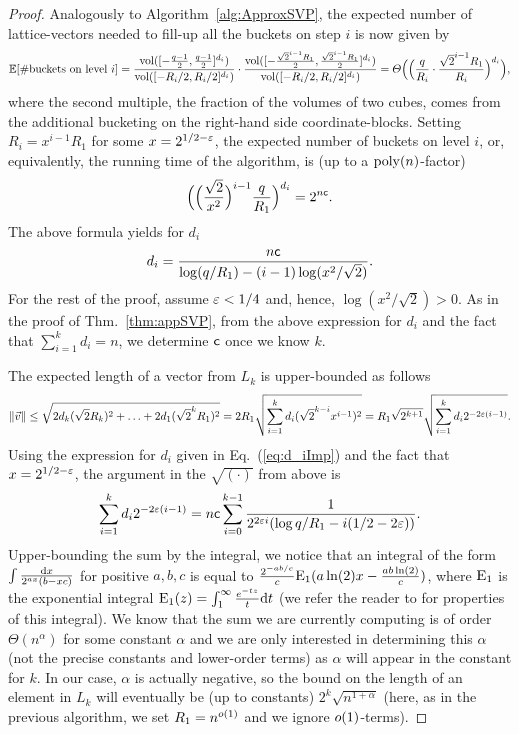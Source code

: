 \begin{proof}
	Analogously to Algorithm~\ref{alg:ApproxSVP}, the expected number of lattice-vectors needed to fill-up all the buckets on step $i$ is now given by
	\[
		\operatorname*{\mathbb{E}}[\#\text{buckets on level } i]= \frac{\operatorname{\mathrm{vol}}([-\frac{q-1}{2}, \frac{q-1}{2}]^{d_i})}{\operatorname{\mathrm{vol}}([-R_i/2, R_i/2]^{d_i})} \cdot \frac{\operatorname{\mathrm{vol}}([-\frac{\sqrt{2}^{i-1}R_1}{2}, \frac{\sqrt{2}^{i-1}R_1}{2}]^{d_i})}{\operatorname{\mathrm{vol}}([-R_i/2, R_i/2]^{d_i})} = \varTheta \Big( \Big(\frac{q}{R_i} \cdot \frac{\sqrt{2}^{i-1}R_1}{R_i} \Big)^{d_i}\Big),
	\]
	where the second multiple, the fraction of the volumes of two cubes, comes from the additional bucketing on the right-hand side coordinate-blocks.
	Setting $R_i = x^{i-1}R_1$ for some $x = 2^{1/2 - \varepsilon}$, the expected number of buckets on level $i$, or, equivalently, the running time of the algorithm, is (up to a $\mathrm{poly}(n)$-factor) 
	\[
		\Big( \Big( \frac{\sqrt{2}}{x^2} \Big)^{i-1} \frac{q}{R_1}  \Big)^{d_i}  = 2^{n \mathsf{c}}.
	\]
	The above formula yields for $d_i$
	\begin{equation}\label{eq:d_iImp}
		d_i = \frac{n\mathsf{c}}{\log(q/R_1)-(i-1)\log(x^2/\sqrt{2})}.
	\end{equation}
	For the rest of the proof, assume $\varepsilon<1/4$ and, hence, $\log(x^2 /\sqrt{2})>0$. As in the proof of Thm.~\ref{thm:appSVP}, from the above expression for $d_i$ and the fact that $\sum_{i=1}^k d_i = n$, we determine $\mathsf{c}$ once we know $k$.
	
	The expected length of a vector from $L_k$ is upper-bounded as follows
	\[
	\| \vvec\| \leq \sqrt{2d_k (\sqrt{2}R_k)^2 + \ldots + 2d_1 (\sqrt{2}^k R_1)^2} = 2R_1 \sqrt{\sum_{i=1}^k d_i (\sqrt{2}^{k-i} x^{i-1})^2} = R_1 \sqrt{2^{k+1}} \sqrt{\sum_{i=1}^k d_i 2^{-2\eps(i-1)}}.
	\] 
	Using the expression for $d_i$ given in Eq.~(\ref{eq:d_iImp}) and the fact that $x= 2^{1/2 - \varepsilon}$, the argument in the $\sqrt{(\cdot)}$ from above is
	\[
		\sum_{i=1}^k d_i 2^{-2\varepsilon(i-1)} =  n \mathsf{c} \sum_{i=0}^{k-1} \frac{1}{2^{2\varepsilon i}(\log{q/R_1} - i (1/2 - 2 \varepsilon))}. 		
	\]
	Upper-bounding the sum by the integral, we notice that an integral of the form $\int \frac{\mathrm{d} x}{2^{ax}(b - x c)}$ for positive $a, b, c$ is equal to $\frac{2^{-ab/c}}{c} \text{E}_1 (a \ln(2)x - \frac{ab\ln(2)}{c})$, where $\text{E}_1$ is the exponential integral $\text{E}_1(z) = \int_1^{\infty} \frac{e^{-tz}}{t} \mathrm{d} t$ (we refer the reader to \cite{Leb63} for properties of this integral). We know that the sum we are currently computing is of order $\Theta(n^{\alpha})$ for some constant $\alpha$ and we are only interested in determining this $\alpha$ (not the precise constants and lower-order terms) as $\alpha$ will appear in the constant for $k$. In our case, $\alpha$ is actually negative, so the bound on the length of an element in $L_k$ will eventually be (up to constants) $2^{k}\sqrt{n^{1+\alpha}}$ (here, as in the previous algorithm, we set $R_1=n^{o(1)}$ and we ignore $o(1)$-terms).
	

\end{proof}
